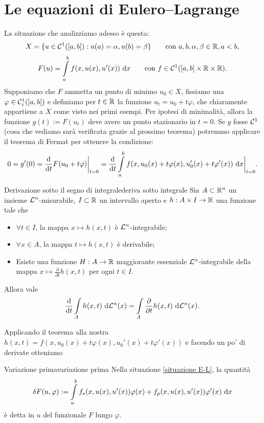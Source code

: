 \documentclass[openany]{book}
\newcommand\di{\text{d}}
\begin{document}
\section{Le equazioni di Eulero--Lagrange}
La situazione che analizziamo adesso è questa:\label{situazione E-L}
\[ X = \{u \in \mathcal{C}^1([a,b]):u(a)=\alpha, u(b)=\beta\} \qquad \text{con }a,b,\alpha,\beta \in \mathbb{R}, a<b, \]
\[ F(u) = \intop_a^b f(x,u(x),u'(x))\de x \qquad \text{con } f \in \mc{C}^1([a,b]\times\R\times\R) .\]
Supponiamo che $F$ ammetta un punto di minimo $u_0 \in X$, fissiamo una $\varphi \in \mathcal{C}_c^1(]a,b[)$ e definiamo per $t \in \mathbb{R}$ la funzione $u_t = u_0 + t\varphi$, che chiaramente appartiene a $X$ come visto nei primi esempi. Per ipotesi di minimalità, allora la funzione $g(t) := F(u_t)$ deve avere un punto stazionario in $t=0$. Se $g$ fosse $\mathcal{C}^1$ (cosa che vediamo sarà verificata grazie al prossimo teorema) potremmo applicare il teorema di Fermat per ottenere la condizione:
\[0 = g'(0) = \frac{\di}{\di t}F(u_0 + t \varphi)\bigg|_{t=0} = \frac{\di}{\di t} \intop_a^b f(x, u_0(x) + t\varphi(x), u_0'(x) + t\varphi'(x)) \de x \bigg|_{t=0}.\]

\begin{theorem}{Derivazione sotto il segno di integrale}{deriva sotto integrale}
    Sia $A \subset \mathbb{R}^n$ un insieme $\mathcal{L}^n$-misurabile, $I\subset \mathbb{R}$ un intervallo aperto e $h: A\times I \to \mathbb{R}$ una funzione tale che\begin{itemize}
        \item $\forall t \in I$, la mappa $x\mapsto h(x,t)$ è $\mathcal{L}^n$-integrabile;
        \item $\forall x \in A$, la mappa $t\mapsto h(x,t)$ è derivabile;
        \item Esiste una funzione $H : A\to\mathbb{R}$ maggiorante essenziale $\mathcal{L}^n$-integrabile della mappa $x\mapsto \frac{\partial}{\partial t} h(x,t)$ per ogni $t \in I$.
    \end{itemize}
    Allora vale
    \[ \frac{\di}{\di t}\intop_A h(x,t)\de \L^n(x) = \intop_A \frac{\partial}{\partial t} h(x,t) \de\L^n(x) .\]
\end{theorem}

Applicando il teorema alla nostra $h(x,t) = f(x,u_0(x)+t\varphi(x), u_0'(x) + t\varphi'(x))$ e facendo un po' di derivate otteniamo

\begin{definition}{Variazione prima}{variazione prima}
    Nella situazione \ref{situazione E-L}, la quantità
    \[\delta F(u, \varphi) := \intop_a^b f_s(x,u(x),u'(x))\varphi(x) + f_p(x,u(x),u'(x))\varphi'(x)\de x \]
    è detta  in $u$ del funzionale $F$ lungo $\varphi$.
\end{definition}
\end{document}
